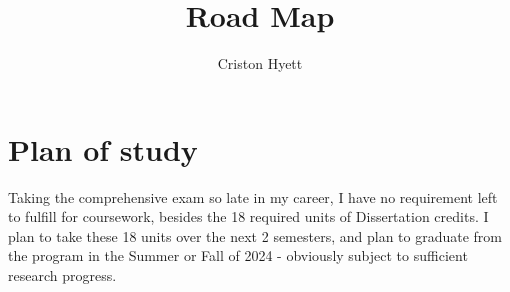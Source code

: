 \documentclass{article}
\title{Road Map}
\author{Criston Hyett}
\begin{document}
\maketitle


\section{Plan of study}
Taking the comprehensive exam so late in my career, I have no requirement left to fulfill for coursework, besides the 18 required units of Dissertation credits. I plan to take these 18 units over the next 2 semesters, and plan to graduate from the program in the Summer or Fall of 2024 - obviously subject to sufficient research progress.
\end{document}
